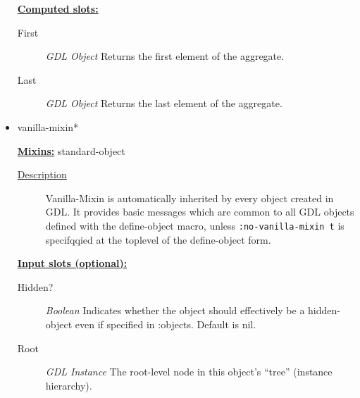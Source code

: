 \documentclass [11pt]{book}
\begin{document}
\begin{itemize}
\begin{description}
\end{description}








\textbf{
\underline{Computed slots:}}

\begin{description}

\item [First]
\emph{GDL Object} Returns the first element of the aggregate.


\item [Last]
\emph{GDL Object} Returns the last element of the aggregate.


\end{description}







\item {}vanilla-mixin*


\textbf{
\underline{Mixins:}} standard-object





\begin{description}

\item [
\underline{Description}]


Vanilla-Mixin is automatically inherited by every object
created in GDL. It provides basic messages which are common to all GDL objects defined
with the define-object macro, unless \texttt{:no-vanilla-mixin t} is specifqqied at the toplevel
of the define-object form.



\end{description}








\textbf{
\underline{Input slots (optional):}}

\begin{description}

\item [Hidden?]
\emph{Boolean} Indicates whether the object should effectively be a hidden-object even if specified in :objects. Default is nil.


\item [Root]
\emph{GDL Instance} The root-level node in this object's ``tree'' (instance hierarchy).



\end{description}
\end{itemize}
\end{document}

